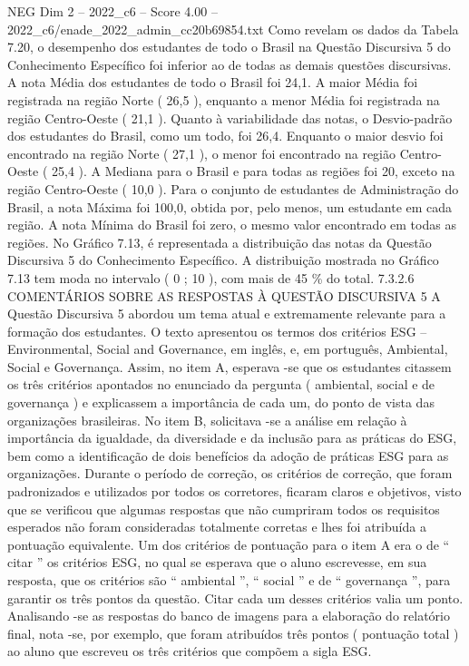 \begin{textsample}{NEG Dim 2 – 2022\_c6 – Score 4.00 – 2022\_c6/enade\_2022\_admin\_cc20b69854.txt}
Como revelam os dados da Tabela 7.20, o desempenho dos estudantes de todo o Brasil na Questão Discursiva 5 do Conhecimento Específico foi inferior ao de todas as demais questões discursivas.
A nota Média dos estudantes de todo o Brasil foi 24,1.
A maior Média foi registrada na região Norte ( 26,5 ), enquanto a menor Média foi registrada na região Centro-Oeste ( 21,1 ).
Quanto à variabilidade das notas, o Desvio-padrão dos estudantes do Brasil, como um todo, foi 26,4.
Enquanto o maior desvio foi encontrado na região Norte ( 27,1 ), o menor foi encontrado na região Centro-Oeste ( 25,4 ).
A Mediana para o Brasil e para todas as regiões foi 20, exceto na região Centro-Oeste ( 10,0 ).
Para o conjunto de estudantes de Administração do Brasil, a nota Máxima foi 100,0, obtida por, pelo menos, um estudante em cada região.
A nota Mínima do Brasil foi zero, o mesmo valor encontrado em todas as regiões.
No Gráfico 7.13, é representada a distribuição das notas da Questão Discursiva 5 do Conhecimento Específico.
A distribuição mostrada no Gráfico 7.13 tem moda no intervalo ( 0 ; 10 ), com mais de 45 \% do total. 7.3.2.6 COMENTÁRIOS SOBRE AS RESPOSTAS À QUESTÃO DISCURSIVA 5 A Questão Discursiva 5 abordou um tema atual e extremamente relevante para a formação dos estudantes.
O texto apresentou os termos dos critérios ESG – Environmental, Social and Governance, em inglês, e, em português, Ambiental, Social e Governança.
Assim, no item A, esperava -se que os estudantes citassem os três critérios apontados no enunciado da pergunta ( ambiental, social e de governança ) e explicassem a importância de cada um, do ponto de vista das organizações brasileiras.
No item B, solicitava -se a análise em relação à importância da igualdade, da diversidade e da inclusão para as práticas do ESG, bem como a identificação de dois benefícios da adoção de práticas ESG para as organizações.
Durante o período de correção, os critérios de correção, que foram padronizados e utilizados por todos os corretores, ficaram claros e objetivos, visto que se verificou que algumas respostas que não cumpriram todos os requisitos esperados não foram consideradas totalmente corretas e lhes foi atribuída a pontuação equivalente.
Um dos critérios de pontuação para o item A era o de “ citar ” os critérios ESG, no qual se esperava que o aluno escrevesse, em sua resposta, que os critérios são “ ambiental ”, “ social ” e de “ governança ”, para garantir os três pontos da questão.
Citar cada um desses critérios valia um ponto.
Analisando -se as respostas do banco de imagens para a elaboração do relatório final, nota -se, por exemplo, que foram atribuídos três pontos ( pontuação total ) ao aluno que escreveu os três critérios que compõem a sigla ESG.

\end{textsample}
